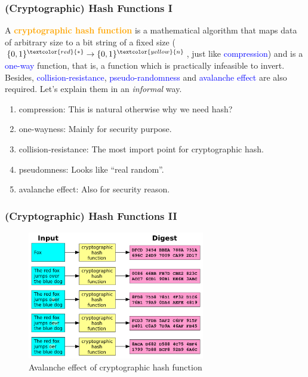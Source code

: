 \documentclass{beamer}
\begin{document}
\begin{frame}\frametitle{(Cryptographic) Hash Functions I}
A \textcolor{orange}{\textbf{cryptographic hash function}} is a mathematical algorithm that maps data of arbitrary size to a bit string of a fixed size ($\{0,1\}^{\textcolor{red}{*}} \rightarrow \{0,1\}^{\textcolor{yellow}{n}}$, just like \textcolor{blue}{compression}) and is a \textcolor{blue}{one-way} function, that is, a function which is practically infeasible to invert. Besides, \textcolor{blue}{collision-resistance}, \textcolor{blue}{pseudo-randomness} and \textcolor{blue}{avalanche effect} are also required. Let's explain them in an \textit{informal} way.
\begin{enumerate}
	\item compression: This is natural otherwise why we need hash?
	\item one-wayness: Mainly for security purpose.
	\item collision-resistance: The most import point for cryptographic hash.
	\item pseudomness: Looks like ``real random''.
	\item avalanche effect: Also for security reason.
\end{enumerate}
\end{frame}
\begin{frame}\frametitle{(Cryptographic) Hash Functions II}
\begin{figure}
	\includegraphics[width=3.8 in, height=2.2in]{myfigs/wikipedia-CryptographicHashFunction.jpg}
	\caption{Avalanche effect of cryptographic hash function}
\end{figure}
\end{frame}
\end{document}
